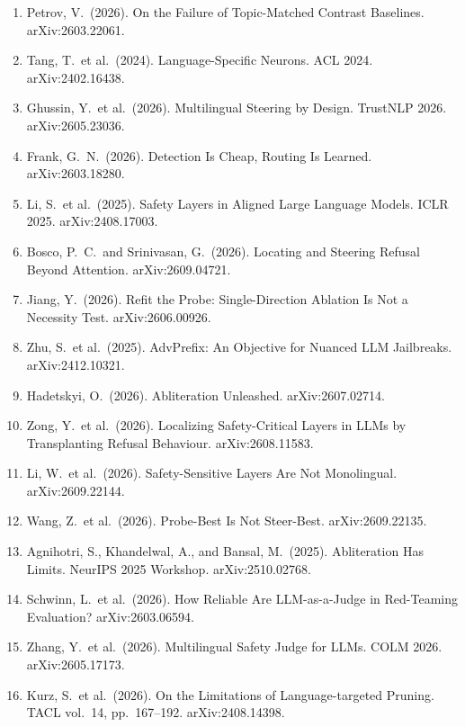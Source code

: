 \documentclass[11pt,letterpaper]{article}
\begin{document}
\begin{enumerate}
\item[{[15]}] Petrov, V.\ (2026). On the Failure of Topic-Matched Contrast Baselines. arXiv:2603.22061.
\item[{[16]}] Tang, T.\ et al.\ (2024). Language-Specific Neurons. ACL 2024. arXiv:2402.16438.
\item[{[17]}] Ghussin, Y.\ et al.\ (2026). Multilingual Steering by Design. TrustNLP 2026. arXiv:2605.23036.
\item[{[18]}] Frank, G.~N.\ (2026). Detection Is Cheap, Routing Is Learned. arXiv:2603.18280.
\item[{[19]}] Li, S.\ et al.\ (2025). Safety Layers in Aligned Large Language Models. ICLR 2025. arXiv:2408.17003.
\item[{[20]}] Bosco, P.~C.\ and Srinivasan, G.\ (2026). Locating and Steering Refusal Beyond Attention. arXiv:2609.04721.
\item[{[21]}] Jiang, Y.\ (2026). Refit the Probe: Single-Direction Ablation Is Not a Necessity Test. arXiv:2606.00926.
\item[{[22]}] Zhu, S.\ et al.\ (2025). AdvPrefix: An Objective for Nuanced LLM Jailbreaks. arXiv:2412.10321.
\item[{[23]}] Hadetskyi, O.\ (2026). Abliteration Unleashed. arXiv:2607.02714.
\item[{[24]}] Zong, Y.\ et al.\ (2026). Localizing Safety-Critical Layers in LLMs by Transplanting Refusal Behaviour. arXiv:2608.11583.
\item[{[25]}] Li, W.\ et al.\ (2026). Safety-Sensitive Layers Are Not Monolingual. arXiv:2609.22144.
\item[{[26]}] Wang, Z.\ et al.\ (2026). Probe-Best Is Not Steer-Best. arXiv:2609.22135.
\item[{[27]}] Agnihotri, S., Khandelwal, A., and Bansal, M.\ (2025). Abliteration Has Limits. NeurIPS 2025 Workshop. arXiv:2510.02768.
\item[{[28]}] Schwinn, L.\ et al.\ (2026). How Reliable Are LLM-as-a-Judge in Red-Teaming Evaluation? arXiv:2603.06594.
\item[{[29]}] Zhang, Y.\ et al.\ (2026). Multilingual Safety Judge for LLMs. COLM 2026. arXiv:2605.17173.
\item[{[30]}] Kurz, S.\ et al.\ (2026). On the Limitations of Language-targeted Pruning. TACL vol.~14, pp.~167--192. arXiv:2408.14398.
\end{enumerate}
\end{document}

